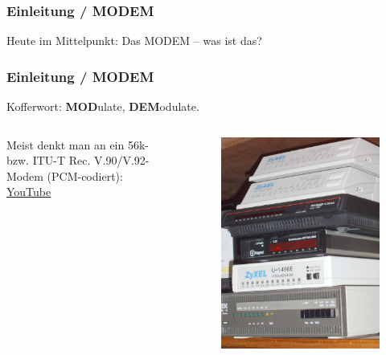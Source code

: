 \begin{frame}
  \frametitle{Einleitung / MODEM}

  Heute im Mittelpunkt: Das MODEM -- was ist das?

\end{frame}

\begin{frame}
  \frametitle{Einleitung / MODEM}

  Kofferwort: \textbf{MOD}ulate, \textbf{DEM}odulate.

  \begin{columns}[c]
    Meist denkt man an ein 56k- bzw. ITU-T Rec. V.90/V.92-Modem (PCM-codiert):\\[1em]
    \centering \href{https://www.youtube.com/watch?v=abapFJN6glo}{\ExternalLink YouTube}
    \begin{center}
      \begin{figure}
        \includegraphics[width=.9\textwidth,height=.7\textheight,keepaspectratio]{e16/Modems.jpg}
      \end{figure}
    \end{center}
  \end{columns}

\end{frame}

